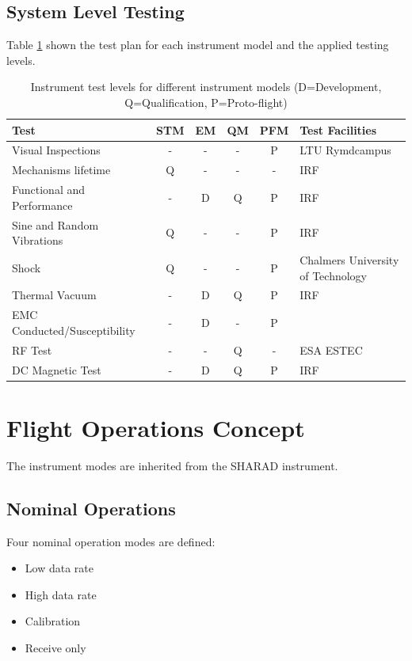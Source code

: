 \subsection{System Level Testing}
%
%
Table \ref{tab:instrument_testing} shown the test plan for each instrument model and the applied testing levels.
%
\begin{table}[H]
\centering
\caption{Instrument test levels for different instrument models (D=Development, Q=Qualification, P=Proto-flight)}
\label{tab:instrument_testing}
\begin{tabular}{p{}ccccp{}}
\hline
\textbf{Test} & \textbf{STM} & \textbf{EM} & \textbf{QM}& \textbf{PFM} & \textbf{Test Facilities}\\
\hline
Visual Inspections & - & - & - & P & LTU Rymdcampus\\
Mechanisms lifetime & Q & - & - & - & \ac{IRF}\\
Functional and Performance & - & D & Q & P & \ac{IRF}\\
Sine and Random Vibrations & Q & - & - & P & \ac{IRF}\\
Shock & Q & - & - & P &Chalmers University of Technology\cite{Jonsson}\\
Thermal Vacuum & - & D & Q & P & \ac{IRF}\\
EMC Conducted/Susceptibility & - & D & - & P &\\
RF Test & - & - & Q & - & ESA ESTEC\\
DC Magnetic Test & - & D & Q & P & \ac{IRF}\\
\hline
\end{tabular}
\end{table}
%
%
%
\section{Flight Operations Concept}
%
The instrument modes are inherited from the SHARAD instrument\cite{SHARAD_ppt}.
%
\subsection{Nominal Operations}
%
Four nominal operation modes are defined:
\begin{itemize}
\item Low data rate
\item High data rate
\item Calibration
\item Receive only
\end{itemize}
%
